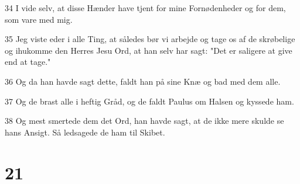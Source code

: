 \par 34 I vide selv, at disse Hænder have tjent for mine Fornødenheder og for dem, som vare med mig.
\par 35 Jeg viste eder i alle Ting, at således bør vi arbejde og tage os af de skrøbelige og ihukomme den Herres Jesu Ord, at han selv har sagt: "Det er saligere at give end at tage."
\par 36 Og da han havde sagt dette, faldt han på sine Knæ og bad med dem alle.
\par 37 Og de brast alle i heftig Gråd, og de faldt Paulus om Halsen og kyssede ham.
\par 38 Og mest smertede dem det Ord, han havde sagt, at de ikke mere skulde se hans Ansigt. Så ledsagede de ham til Skibet.

\chapter{21}

